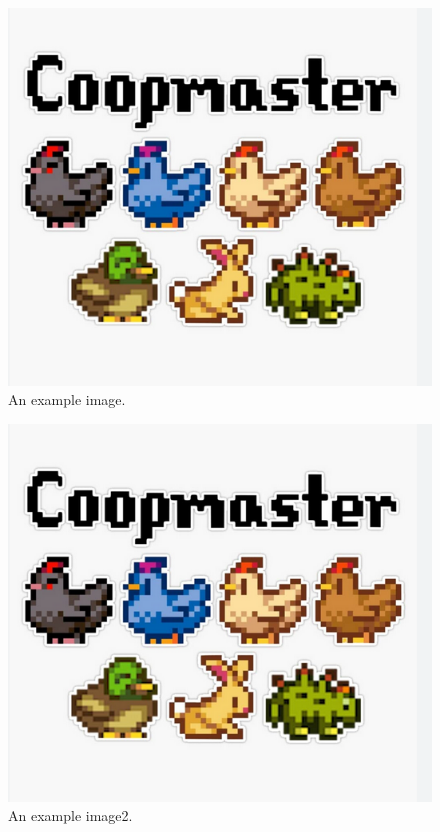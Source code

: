 \documentclass{article}
\begin{document}
    \begin{figure}[h!]
        \centering
        \includegraphics{images/coopmaster}
        \caption{An example image.}
        \label{fig:example3}

    \end{figure}

    \begin{figure}[h!]
        \centering
        \includegraphics{coopmaster}
        \caption{An example image2.}
        \label{fig:example2}
    \end{figure}
\end{document}
